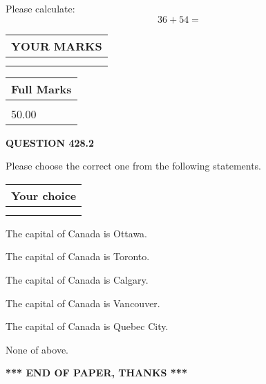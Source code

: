 \documentclass[12pt]{article}
\begin{document}
  
 
Please calculate:
\begin{equation}
36 +  %
54 = \nonumber
\end{equation}
 

 

 
  
\vspace{0.2in}
  
\noindent\begin{tabular}{|l|}
\hline
 YOUR MARKS  \\
\hline
 \\ 
 \\ 
\hline
\end{tabular}
\hspace{0.05in} \begin{tabular}{|l|}
\hline
 Full Marks  \\
\hline
 \\ 
50.00 \\
\hline
\end{tabular}
{\textbf{\Large{QUESTION
428.2 
}}}
  
  
Please choose the correct one from the following statements.
  
  
\noindent\hspace{3.0in} \begin{tabular}{|l|}
\hline
Your choice \\
\hline
 \\ 
 \\ 
\hline
\end{tabular}
  
  
 
 
The capital of Canada is Ottawa.
 
 
The capital of Canada is Toronto.
 
 
The capital of Canada is Calgary.
 
 
The capital of Canada is Vancouver.
 
 
The capital of Canada is Quebec City.
 
 
 None of above.
 
 
   
   
 \vspace{0.2in}
 
   
   
   
   
\vspace{1.0in} 
{\textbf{\large{ *** END OF PAPER, THANKS *** }}} 
   
\end{document}
